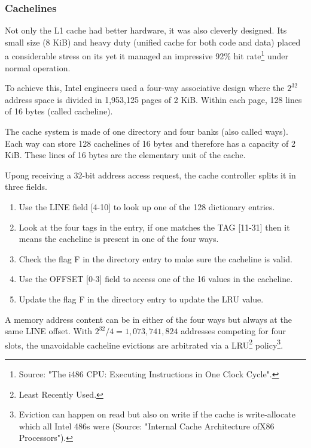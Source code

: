 \subsubsection{Cachelines}
Not only the L1 cache had better hardware, it was also cleverly designed. Its small size (8 KiB) and heavy duty (unified cache for both code and data) placed a considerable stress on its yet it managed an impressive 92\% hit rate\footnote{Source: "The i486 CPU: Executing Instructions in One Clock Cycle".} under normal operation.\\
\par
To achieve this, Intel engineers used a four-way associative design where the $2^{32}$ address space is divided in 1,953,125 pages of 2 KiB. Within each page, 128 lines of 16 bytes (called cacheline).\\
\par
{}
\par
The cache system is made of one directory and four banks (also called ways). Each way can store 128 cachelines of 16 bytes and therefore has a capacity of 2 KiB. These lines of 16 bytes are the elementary unit of the cache.\\
\par
Upong receiving a 32-bit address access request, the cache controller splits it in three fields.
\begin{enumerate}
\item Use the LINE field [4-10] to look up one of the 128 dictionary entries.
\item Look at the four tags in the entry, if one matches the TAG [11-31] then it means the cacheline is present in one of the four ways.
\item Check the flag F in the directory entry to make sure the cacheline is valid.
\item Use the OFFSET [0-3] field to access one of the 16 values in the cacheline.
\item Update the flag F in the directory entry to update the LRU value.
\end{enumerate}
\par
A memory address content can be in either of the four ways but always at the same LINE offset. With $2^{32} / 4 = 1,073,741,824$ addresses competing for four slots, the unavoidable cacheline evictions are arbitrated via a LRU\footnote{Least Recently Used.} policy\footnote{Eviction can happen on read but also on write if the cache is write-allocate which all Intel 486s were (Source: "Internal Cache Architecture ofX86 Processors").}.\\
